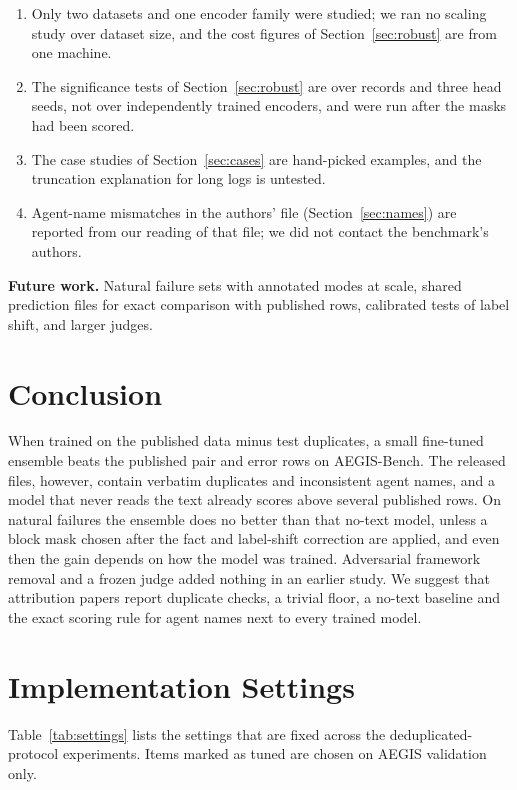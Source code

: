 \documentclass[conference]{IEEEtran}
\begin{document}
\begin{enumerate}
\item Only two datasets and one encoder family were studied; we ran no scaling study over dataset size, and the cost figures of Section~\ref{sec:robust} are from one machine.
\item The significance tests of Section~\ref{sec:robust} are over records and three head seeds, not over independently trained encoders, and were run after the masks had been scored.
\item The case studies of Section~\ref{sec:cases} are hand-picked examples, and the truncation explanation for long logs is untested.
\item Agent-name mismatches in the authors' file (Section~\ref{sec:names}) are reported from our reading of that file; we did not contact the benchmark's authors.
\end{enumerate}
\textbf{Future work.} Natural failure sets with annotated modes at scale, shared prediction files for exact comparison with published rows, calibrated tests of label shift, and larger judges.

\section{Conclusion}
When trained on the published data minus test duplicates, a small fine-tuned ensemble beats the published pair and error rows on AEGIS-Bench. The released files, however, contain verbatim duplicates and inconsistent agent names, and a model that never reads the text already scores above several published rows. On natural failures the ensemble does no better than that no-text model, unless a block mask chosen after the fact and label-shift correction are applied, and even then the gain depends on how the model was trained. Adversarial framework removal and a frozen judge added nothing in an earlier study. We suggest that attribution papers report duplicate checks, a trivial floor, a no-text baseline and the exact scoring rule for agent names next to every trained model.

\appendices
\section{Implementation Settings}
Table~\ref{tab:settings} lists the settings that are fixed across the deduplicated-protocol experiments. Items marked as tuned are chosen on AEGIS validation only.
\end{document}
